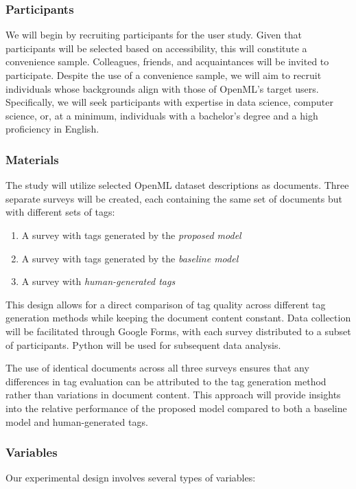 \subsubsection{Participants}
We will begin by recruiting participants for the user study. Given that participants will be selected based on accessibility, this will constitute a convenience sample. Colleagues, friends, and acquaintances will be invited to participate. Despite the use of a convenience sample, we will aim to recruit individuals whose backgrounds align with those of OpenML's target users. Specifically, we will seek participants with expertise in data science, computer science, or, at a minimum, individuals with a bachelor's degree and a high proficiency in English.

\subsubsection{Materials}
The study will utilize selected OpenML dataset descriptions as documents. Three separate surveys will be created, each containing the same set of documents but with different sets of tags:

\begin{enumerate}
\item A survey with tags generated by the \textit{proposed model}
\item A survey with tags generated by the \textit{baseline model}
\item A survey with \textit{human-generated tags}
\end{enumerate}

This design allows for a direct comparison of tag quality across different tag generation methods while keeping the document content constant. Data collection will be facilitated through Google Forms, with each survey distributed to a subset of participants. Python will be used for subsequent data analysis.

The use of identical documents across all three surveys ensures that any differences in tag evaluation can be attributed to the tag generation method rather than variations in document content. This approach will provide insights into the relative performance of the proposed model compared to both a baseline model and human-generated tags.

\subsubsection{Variables}
Our experimental design involves several types of variables:

